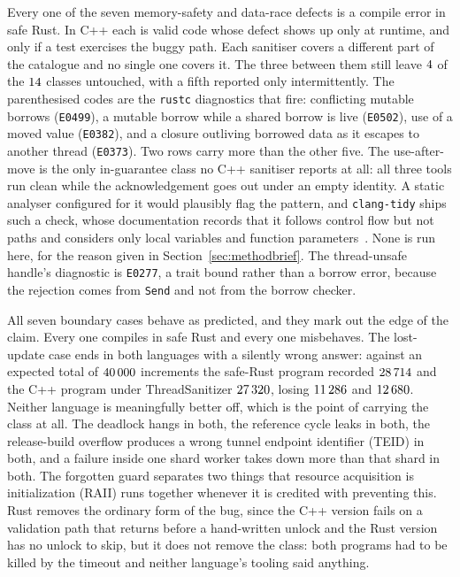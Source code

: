 \documentclass[english,oneside,a4paper,censored,csm,software-track-2020]{HYthesisML}
\begin{document}
Every one of the seven memory-safety and data-race defects is a compile error in safe Rust. In
C++ each is valid code whose defect shows up only at runtime, and only if a test exercises the
buggy path. Each sanitiser covers a different part of the catalogue and no single one covers it.
The three between them still leave $4$ of the $14$ classes
untouched, with a fifth reported only intermittently. The parenthesised codes are the
\texttt{rustc} diagnostics that fire: conflicting mutable borrows (\texttt{E0499}), a mutable
borrow while a shared borrow is live (\texttt{E0502}), use of a moved value (\texttt{E0382}), and
a closure outliving borrowed data as it escapes to another thread (\texttt{E0373}). Two rows carry
more than the other five. The use-after-move is the only in-guarantee class no C++ sanitiser
reports at all: all three tools run clean while the acknowledgement goes out under an empty
identity. A static analyser configured for it would plausibly flag the
pattern, and \texttt{clang-tidy} ships such a check, whose documentation records that it follows
control flow but not paths and considers only local variables and function
parameters~\cite{clangtidyuseaftermove}. None is run here, for the reason given in
Section~\ref{sec:methodbrief}. The thread-unsafe handle's diagnostic is \texttt{E0277}, a trait
bound rather than a borrow error, because the rejection comes from \texttt{Send} and not from the
borrow checker.

All seven boundary cases behave as predicted, and they mark out the edge of the claim. Every one
compiles in safe Rust and every one misbehaves. The lost-update case ends in both languages with
a silently wrong answer: against an expected total of $40\,000$ increments the
safe-Rust program recorded $28\,714$ and the C++ program under ThreadSanitizer
$27\,320$, losing $11\,286$ and $12\,680$. Neither language
is meaningfully better off, which is the point of carrying the class at all. The deadlock hangs
in both, the reference cycle leaks in both, the release-build overflow produces a wrong tunnel
endpoint identifier (TEID) in both, and a failure inside one shard worker takes down more than
that shard in both. The forgotten guard separates two things that resource acquisition is
initialization (RAII) runs together whenever it is credited with preventing this. Rust removes the
ordinary form of the bug, since the C++ version fails on a validation path that returns before a
hand-written unlock and the Rust version has no unlock to skip, but it does not remove the class: both programs had to be killed by the timeout and neither language's
tooling said anything.
\end{document}
